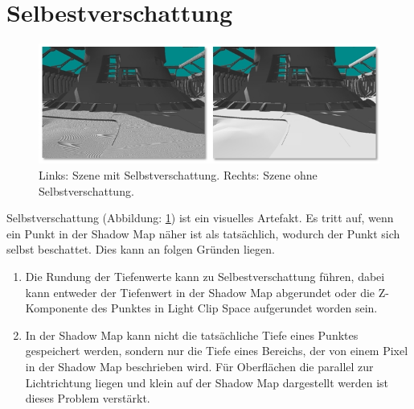 \section{Selbestverschattung}
\label{section:self-shadow}
\begin{figure}[H]
	\begin{center}
    \includegraphics[width=1\textwidth]{res/img/shadow-acne1/image.jpg}
    \caption{Links\hspace{6pt}: Szene mit Selbstverschattung. 
         \newline Rechts: Szene ohne Selbstverschattung.} 
	  \label{fig:shadow-acne-artefact}
	\end{center}
\end{figure}
Selbstverschattung (Abbildung: \ref{fig:shadow-acne-artefact}) ist ein visuelles Artefakt.
Es tritt auf, wenn ein Punkt in der Shadow Map näher ist als tatsächlich, wodurch der Punkt sich selbst beschattet.
Dies kann an folgen Gründen liegen.
\begin{enumerate}
  \item Die Rundung der Tiefenwerte kann zu Selbestverschattung führen, dabei kann entweder der Tiefenwert in der Shadow Map
    abgerundet oder die Z-Komponente des Punktes in Light Clip Space aufgerundet worden sein.
  \item In der Shadow Map kann nicht die tatsächliche Tiefe eines Punktes
    gespeichert werden, sondern nur die Tiefe eines Bereichs, der von einem Pixel in der Shadow Map beschrieben wird.
    Für Oberflächen die parallel zur Lichtrichtung liegen und klein auf der Shadow Map dargestellt werden ist dieses Problem
    verstärkt.
\end{enumerate}


